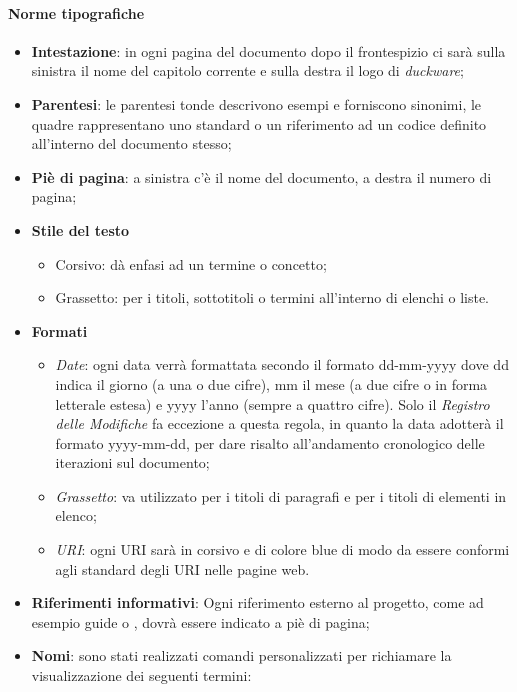 \paragraph{Norme tipografiche}
\begin{itemize}
	\item \textbf{Intestazione}: in ogni pagina del documento dopo il frontespizio ci sarà sulla sinistra il nome del capitolo corrente e sulla destra il logo di \emph{duckware};
	\item \textbf{Parentesi}: le parentesi tonde descrivono esempi e forniscono sinonimi, le quadre rappresentano uno standard  o un riferimento ad un codice definito all’interno del documento stesso;
	\item \textbf{Piè di pagina}: a sinistra c’è il nome del documento, a destra il numero di pagina;
	\item \textbf{Stile del testo}
	\begin{itemize}
		\item Corsivo: dà enfasi ad un termine o concetto;
		\item Grassetto: per i titoli, sottotitoli o termini all’interno di elenchi o liste.
	\end{itemize}
	\item \textbf{Formati}
	\begin{itemize}
		\item \emph{Date}: ogni data verrà formattata secondo il formato dd-mm-yyyy dove dd indica il giorno (a una o due cifre), mm il mese (a due cifre o in forma letterale estesa) e yyyy l’anno (sempre a quattro cifre). Solo il \emph{Registro delle Modifiche} fa eccezione a questa regola, in quanto la data   adotterà il formato yyyy-mm-dd, per dare risalto all'andamento cronologico delle iterazioni sul documento;
		\item \emph{Grassetto}: va utilizzato per i titoli di paragrafi e per i titoli di elementi in elenco;
		\item \emph{URI}: ogni URI sarà in corsivo e di colore blue di modo da essere conformi agli standard degli URI nelle pagine web.
	\end{itemize}
	\item \textbf{Riferimenti informativi}: Ogni riferimento esterno al progetto, come ad esempio guide o , dovrà essere indicato a piè di pagina;
	\item \textbf{Nomi}: sono stati realizzati comandi personalizzati per richiamare la visualizzazione dei seguenti termini:

\end{itemize}
